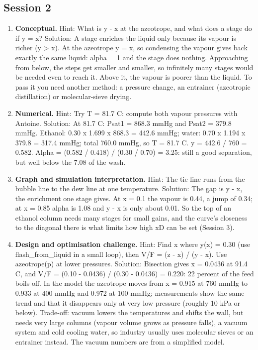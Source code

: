 \documentclass[11pt,a4paper]{article}
\begin{document}
\subsection*{Session 2}
\begin{enumerate}[nosep]
\item \textbf{Conceptual.} Hint: What is y - x at the azeotrope, and what does a stage do if y = x? Solution: A stage enriches the liquid only because its vapour is richer (y > x). At the azeotrope y = x, so condensing the vapour gives back exactly the same liquid: alpha = 1 and the stage does nothing. Approaching from below, the steps get smaller and smaller, so infinitely many stages would be needed even to reach it. Above it, the vapour is poorer than the liquid. To pass it you need another method: a pressure change, an entrainer (azeotropic distillation) or molecular-sieve drying.
\item \textbf{Numerical.} Hint: Try T = 81.7 C: compute both vapour pressures with Antoine. Solution: At 81.7 C: Psat1 = 868.3 mmHg and Psat2 = 379.8 mmHg. Ethanol: 0.30 x 1.699 x 868.3 = 442.6 mmHg; water: 0.70 x 1.194 x 379.8 = 317.4 mmHg; total 760.0 mmHg, so T = 81.7 C. y = 442.6 / 760 = 0.582. Alpha = (0.582 / 0.418) / (0.30 / 0.70) = 3.25: still a good separation, but well below the 7.08 of the wash.
\item \textbf{Graph and simulation interpretation.} Hint: The tie line runs from the bubble line to the dew line at one temperature. Solution: The gap is y - x, the enrichment one stage gives. At x = 0.1 the vapour is 0.44, a jump of 0.34; at x = 0.85 alpha is 1.08 and y - x is only about 0.01. So the top of an ethanol column needs many stages for small gains, and the curve's closeness to the diagonal there is what limits how high xD can be set (Session 3).
\item \textbf{Design and optimisation challenge.} Hint: Find x where y(x) = 0.30 (use flash\_from\_liquid in a small loop), then V/F = (z - x) / (y - x). Use azeotrope(p) at lower pressures. Solution: Bisection gives x = 0.0436 at 91.4 C, and V/F = (0.10 - 0.0436) / (0.30 - 0.0436) = 0.220: 22 percent of the feed boils off. In the model the azeotrope moves from x = 0.915 at 760 mmHg to 0.933 at 400 mmHg and 0.972 at 100 mmHg; measurements show the same trend and that it disappears only at very low pressure (roughly 10 kPa or below). Trade-off: vacuum lowers the temperatures and shifts the wall, but needs very large columns (vapour volume grows as pressure falls), a vacuum system and cold cooling water, so industry usually uses molecular sieves or an entrainer instead. The vacuum numbers are from a simplified model.
\end{enumerate}
\end{document}
